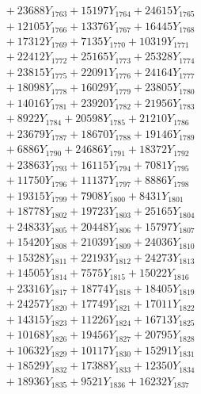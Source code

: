 \documentclass[a4paper,10pt]{article}
\begin{document}
{\begin{align}
&\;  + 23688 Y_{1763} + 15197 Y_{1764} + 24615 Y_{1765} \\[0.3ex]
&\;  + 12105 Y_{1766} + 13376 Y_{1767} + 16445 Y_{1768} \\[0.5ex]\allowbreak
&\;  + 17312 Y_{1769} + 7135 Y_{1770} + 10319 Y_{1771} \\[0.3ex]
&\;  + 22412 Y_{1772} + 25165 Y_{1773} + 25328 Y_{1774} \\[0.3ex]
&\;  + 23815 Y_{1775} + 22091 Y_{1776} + 24164 Y_{1777} \\[0.3ex]
&\;  + 18098 Y_{1778} + 16029 Y_{1779} + 23805 Y_{1780} \\[0.3ex]
&\;  + 14016 Y_{1781} + 23920 Y_{1782} + 21956 Y_{1783} \\[0.3ex]
&\;  + 8922 Y_{1784} + 20598 Y_{1785} + 21210 Y_{1786} \\[0.3ex]
&\;  + 23679 Y_{1787} + 18670 Y_{1788} + 19146 Y_{1789} \\[0.3ex]
&\;  + 6886 Y_{1790} + 24686 Y_{1791} + 18372 Y_{1792} \\[0.3ex]
&\;  + 23863 Y_{1793} + 16115 Y_{1794} + 7081 Y_{1795} \\[0.3ex]
&\;  + 11750 Y_{1796} + 11137 Y_{1797} + 8886 Y_{1798} \\[0.5ex]\allowbreak
&\;  + 19315 Y_{1799} + 7908 Y_{1800} + 8431 Y_{1801} \\[0.3ex]
&\;  + 18778 Y_{1802} + 19723 Y_{1803} + 25165 Y_{1804} \\[0.3ex]
&\;  + 24833 Y_{1805} + 20448 Y_{1806} + 15797 Y_{1807} \\[0.3ex]
&\;  + 15420 Y_{1808} + 21039 Y_{1809} + 24036 Y_{1810} \\[0.3ex]
&\;  + 15328 Y_{1811} + 22193 Y_{1812} + 24273 Y_{1813} \\[0.3ex]
&\;  + 14505 Y_{1814} + 7575 Y_{1815} + 15022 Y_{1816} \\[0.3ex]
&\;  + 23316 Y_{1817} + 18774 Y_{1818} + 18405 Y_{1819} \\[0.3ex]
&\;  + 24257 Y_{1820} + 17749 Y_{1821} + 17011 Y_{1822} \\[0.3ex]
&\;  + 14315 Y_{1823} + 11226 Y_{1824} + 16713 Y_{1825} \\[0.3ex]
&\;  + 10168 Y_{1826} + 19456 Y_{1827} + 20795 Y_{1828} \\[0.5ex]\allowbreak
&\;  + 10632 Y_{1829} + 10117 Y_{1830} + 15291 Y_{1831} \\[0.3ex]
&\;  + 18529 Y_{1832} + 17388 Y_{1833} + 12350 Y_{1834} \\[0.3ex]
&\;  + 18936 Y_{1835} + 9521 Y_{1836} + 16232 Y_{1837} \\[0.3ex]

\end{align}}
\end{document}
